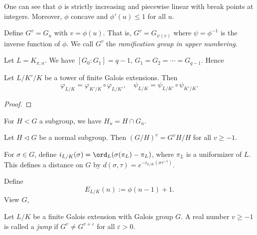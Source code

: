   One can see that $\phi$ is strictly increasing and piecewise linear with break points at integers.
  Moreover, $\phi$ concave and $\phi'(u) \leq 1$ for all $u$.

  \begin{definition}
    Define $G^v = G_u$ with $v = \phi(u)$.
    That is, $G^v = G_{\psi(v)}$ where $\psi = \phi^{-1}$ is the inverse function of $\phi$.
    We call $G^v$ the \emph{ramification group in upper numbering}.
  \end{definition}

  \begin{example}
    Let $L = K_{\pi,n}$.
    We have $[G_0: G_1] = q-1$, $G_1 = G_2 = \cdots = G_{q-1}$.
    Hence
    \Yang{}
  \end{example}

  \begin{proposition}
    Let $L/K'/K$ be a tower of finite Galois extensions.
    Then 
    \[ \varphi_{L/K} = \varphi_{K'/K} \circ \varphi_{L/K'}, \quad \psi_{L/K} = \psi_{L/K'} \circ \psi_{K'/K}. \]
  \end{proposition}
  \begin{proof}
    \Yang{}
  \end{proof}

    For $H < G$ a subgroup, we have $H_u = H \cap G_u$.

  \begin{theorem}
    Let $H \triangleleft G$ be a normal subgroup.
    Then $(G/H)^v = G^v H / H$ for all $v \geq -1$.
  \end{theorem}

  \begin{remark}
    For $\sigma \in G$, define $i_{L/K}(\sigma) = \ord_L(\sigma(\pi_L) - \pi_L)$, where $\pi_L$ is a uniformizer of $L$.
    This defines a distance on $G$ by $d(\sigma, \tau) = e^{-i_{L/K}(\sigma \tau^{-1})}$.

    Define
    \[ E_{L/K}(n) := \phi(n-1) + 1. \]
    View $G$,
    \Yang{}
  \end{remark}

    

  \begin{definition}
    Let $L/K$ be a finite Galois extension with Galois group $G$.
    A real number $v \geq -1$ is called a \emph{jump} if $G^v \neq G^{v+\varepsilon}$ for all $\varepsilon > 0$.
  \end{definition}

